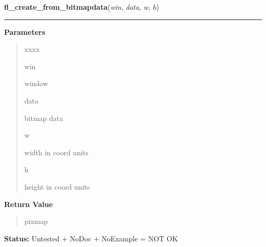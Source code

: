     \label{xformslib:library:fl_create_from_bitmapdata}

    \vspace{0.5ex}

\hspace{.8\funcindent}\begin{boxedminipage}{\funcwidth}

    \raggedright \textbf{fl\_create\_from\_bitmapdata}(\textit{win}, \textit{data}, \textit{w}, \textit{h})

    \vspace{-1.5ex}

    \rule{\textwidth}{0.5\fboxrule}
\setlength{\parskip}{2ex}
\setlength{\parskip}{1ex}
      \textbf{Parameters}
      \vspace{-1ex}

      \begin{quote}
        \begin{Ventry}{xxxx}

          \item[win]

          window

          \item[data]

          bitmap data

          \item[w]

          width in coord units

          \item[h]

          height in coord units

        \end{Ventry}

      \end{quote}

      \textbf{Return Value}
    \vspace{-1ex}

      \begin{quote}
      pixmap

      \end{quote}

\textbf{Status:} Untested + NoDoc + NoExample = NOT OK



    \end{boxedminipage}

